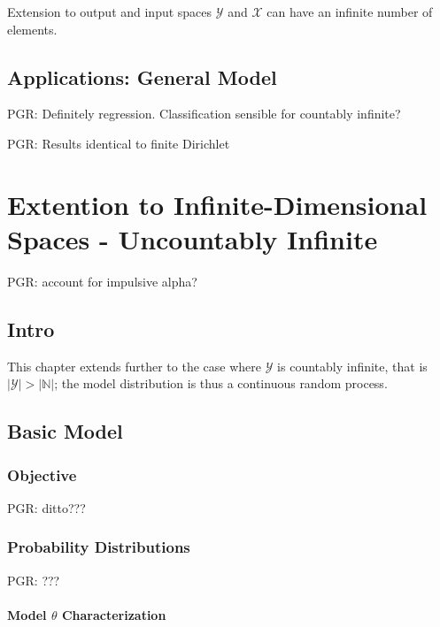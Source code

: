 \documentclass[12pt]{report}
\begin{document}
Extension to output and input spaces $\mathcal{Y}$ and $\mathcal{X}$ can have an infinite number of elements. 


\section{Applications: General Model}

PGR: Definitely regression. Classification sensible for countably infinite?

PGR: Results identical to finite Dirichlet












\chapter{Extention to Infinite-Dimensional Spaces - Uncountably Infinite}

PGR: account for impulsive alpha?


\section{Intro}

This chapter extends further to the case where $\mathcal{Y}$ is countably infinite, that is $|\mathcal{Y}| > |\mathbb{N}|$; the model distribution is thus a continuous random process. 


\section{Basic Model}


\subsection{Objective}

PGR: ditto???


\subsection{Probability Distributions}

PGR: ???


\subsubsection{Model $\theta$ Characterization}
\end{document}
